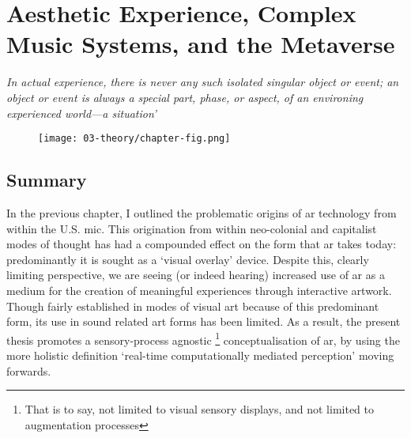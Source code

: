 \chapter{Aesthetic Experience, Complex Music Systems, and the Metaverse}
\label{sec: theory}
\epigraph{\emph{In actual experience, there is never any such isolated singular object or event; an object or event is always a special part, phase, or aspect, of an environing experienced world—a situation'}}{\citep[p. 67]{dewey1934}}

\begin{figure}
    \centering
    \texttt{[image: 03-theory/chapter-fig.png]}
    \captionsetup{labelformat=empty}
    \caption[\autoref*{sec: theory}'s page-figure: Three photographs from the Sensory Cartographies project, (from , \citeyear{tonn2017})]{}
\end{figure}

\clearpage
\section{Summary}\label{sec: theory-summary}
In the previous chapter, I outlined the problematic origins of \gls{ar} technology from within the U.S. \gls{mic}. This origination from within neo-colonial and capitalist modes of thought has had a compounded effect on the form that \gls{ar} takes today: predominantly it is sought as a `visual overlay' device. Despite this, clearly limiting perspective, we are seeing (or indeed hearing) increased use of \gls{ar} as a medium for the creation of meaningful experiences through interactive artwork. Though fairly established in modes of visual art because of this predominant form, its use in sound related art forms has been limited. As a result, the present thesis promotes a sensory-process agnostic \footnote{That is to say, not limited to visual sensory displays, and not limited to augmentation processes} conceptualisation of \gls{ar}, by using the more holistic definition `real-time computationally mediated perception' \citep{kiefer2018} moving forwards. 

